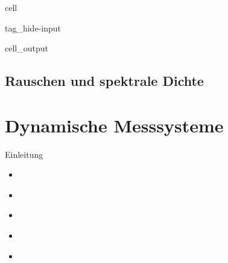 \documentclass[letterpaper,10pt,english]{jupyterBook}
\begin{document}
\begin{sphinxuseclass}{cell}
\begin{sphinxuseclass}{tag_hide-input}\begin{sphinxVerbatimOutput}

\begin{sphinxuseclass}{cell_output}
\noindent{}

\end{sphinxuseclass}\end{sphinxVerbatimOutput}

\end{sphinxuseclass}
\end{sphinxuseclass}
\sphinxstepscope


\section{Rauschen und spektrale Dichte}
\label{\detokenize{content/3_Rauschen:rauschen-und-spektrale-dichte}}\label{\detokenize{content/3_Rauschen::doc}}
\sphinxstepscope


\chapter{Dynamische Messsysteme}
\label{\detokenize{content/5_Dynamische_Messsysteme:dynamische-messsysteme}}\label{\detokenize{content/5_Dynamische_Messsysteme::doc}}
\sphinxAtStartPar
Einleitung
\begin{itemize}
\item {} 
\sphinxAtStartPar
{\hyperref[\detokenize{content/5_LTI::doc}]{}}

\item {} 
\sphinxAtStartPar
{\hyperref[\detokenize{content/5_DGL::doc}]{}}

\item {} 
\sphinxAtStartPar
{\hyperref[\detokenize{content/5_ImpulsSprung::doc}]{}}

\item {} 
\sphinxAtStartPar
{\hyperref[\detokenize{content/5_Uebertragungsfunktion::doc}]{}}

\item {} 
\sphinxAtStartPar
{\hyperref[\detokenize{content/5_faltung::doc}]{}}

\end{itemize}
\end{document}
